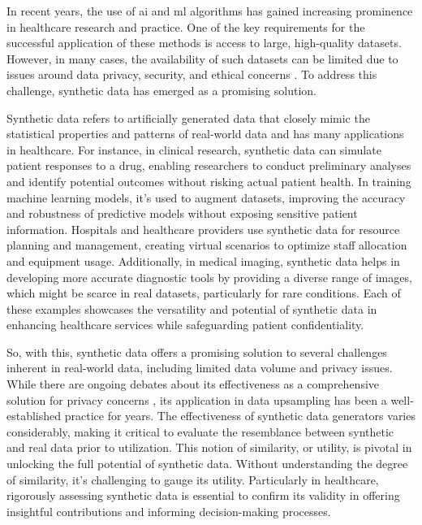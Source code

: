 
In recent years, the use of \ac{ai} and \ac{ml} algorithms has gained increasing prominence in healthcare research and practice. One of the key requirements for the successful application of these methods is access to large, high-quality datasets. However, in many cases, the availability of such datasets can be limited due to issues around data privacy, security, and ethical concerns \cite{chingOpportunitiesObstaclesDeep2018a}. To address this challenge, synthetic data has emerged as a promising solution. 

Synthetic data refers to artificially generated data that closely mimic the statistical properties and patterns of real-world data \cite{mullerEvaluationSyntheticElectronic2022} and has many applications in healthcare. For instance, in clinical research, synthetic data can simulate patient responses to a drug, enabling researchers to conduct preliminary analyses and identify potential outcomes without risking actual patient health. In training machine learning models, it's used to augment datasets, improving the accuracy and robustness of predictive models without exposing sensitive patient information. Hospitals and healthcare providers use synthetic data for resource planning and management, creating virtual scenarios to optimize staff allocation and equipment usage. Additionally, in medical imaging, synthetic data helps in developing more accurate diagnostic tools by providing a diverse range of images, which might be scarce in real datasets, particularly for rare conditions. Each of these examples showcases the versatility and potential of synthetic data in enhancing healthcare services while safeguarding patient confidentiality.

So, with this, synthetic data offers a promising solution to several challenges inherent in real-world data, including limited data volume and privacy issues. While there are ongoing debates about its effectiveness as a comprehensive solution for privacy concerns \cite{stadlerSyntheticDataPrivacy2020}, its application in data upsampling has been a well-established practice for years. The effectiveness of synthetic data generators varies considerably, making it critical to evaluate the resemblance between synthetic and real data prior to utilization. This notion of similarity, or utility, is pivotal in unlocking the full potential of synthetic data. Without understanding the degree of similarity, it's challenging to gauge its utility. Particularly in healthcare, rigorously assessing synthetic data is essential to confirm its validity in offering insightful contributions and informing decision-making processes. %

